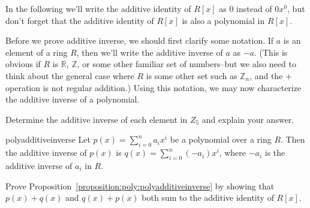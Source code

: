%
%

\noindent
In the following we'll write the additive identity of $R[x]$ as $0$ instead of $0x^0$, but don't forget that the additive identity of $R[x]$ is also a polynomial in $R[x]$.

Before we prove additive inverse, we should first clarify some notation. If $a$ is an element of a ring $R$, then we'll write the additive inverse of $a$ as $-a$.  (This is obvious if $R$ is $\mathbb{R}$, $\mathbb{Z}$, or some other familiar set of numbers--but 
we also need to think about the general case where $R$ is some other set such as $\mathbb{Z}_n$, and the $+$ operation is not regular addition.)  Using this notation, we may now characterize the additive inverse of a polynomial.

\begin{exercise}{}
Determine the additive inverse of each element in $Z_5$ and explain your answer.
\end{exercise}


\begin{prop}{polyadditiveinverse} Let $p(x)=\sum_{i=0}^n a_i x^i$ be a polynomial over a ring $R$. Then the additive inverse of $p(x)$ is $q(x)=\sum_{i=0}^n (-a_i) x^i$, where $-a_i$ is the additive inverse of $a_i$ in $R$.
\end{prop}

\begin{exercise}{}
Prove Proposition~\ref{proposition:poly:polyadditiveinverse} by showing that $p(x) + q(x)$ and $q(x)+ p(x)$ both sum to the additive identity of $R[x]$.
\end{exercise}


